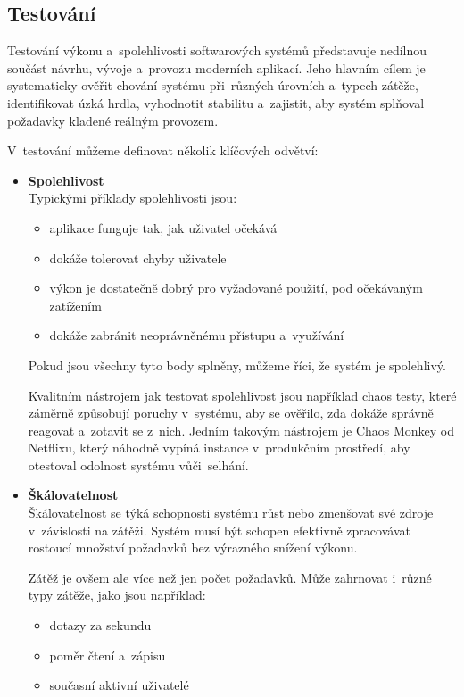 \subsection{Testování}

Testování výkonu a~spolehlivosti softwarových systémů představuje nedílnou součást návrhu,
vývoje a~provozu moderních aplikací. Jeho hlavním cílem je systematicky ověřit chování systému
při~různých úrovních a~typech zátěže, identifikovat úzká hrdla, vyhodnotit stabilitu a~zajistit,
aby systém splňoval požadavky kladené reálným provozem.

V~testování můžeme definovat několik klíčových odvětví:
\begin{itemize}
    \item \textbf{Spolehlivost} \\
    Typickými příklady spolehlivosti jsou:
        \begin{itemize}
            \item aplikace funguje tak, jak uživatel očekává
            \item dokáže tolerovat chyby uživatele
            \item výkon je dostatečně dobrý pro vyžadované použití, pod očekávaným zatížením
            \item dokáže zabránit neoprávněnému přístupu a~využívání
        \end{itemize}
    Pokud jsou všechny tyto body splněny, můžeme říci, že systém je spolehlivý. \cite{kleppmann2017designing}
    
    Kvalitním nástrojem jak testovat spolehlivost jsou například chaos testy, které záměrně způsobují poruchy v~systému, aby se ověřilo, zda dokáže správně reagovat a~zotavit se z~nich.
    Jedním takovým nástrojem je Chaos Monkey od Netflixu, který náhodně vypíná instance v~produkčním prostředí, aby otestoval odolnost systému vůči~selhání. \cite{chaosmonkeydocs}

    \item \textbf{Škálovatelnost} \\
    Škálovatelnost se týká schopnosti systému růst nebo zmenšovat své zdroje v~závislosti na zátěži. Systém musí být schopen efektivně zpracovávat rostoucí množství požadavků bez výrazného snížení výkonu.

    Zátěž je ovšem ale více než jen počet požadavků. Může zahrnovat i~různé typy zátěže, jako jsou například:
    \begin{itemize}
        \item dotazy za sekundu
        \item poměr čtení a~zápisu
        \item současní aktivní uživatelé
    \end{itemize}


\end{itemize}
